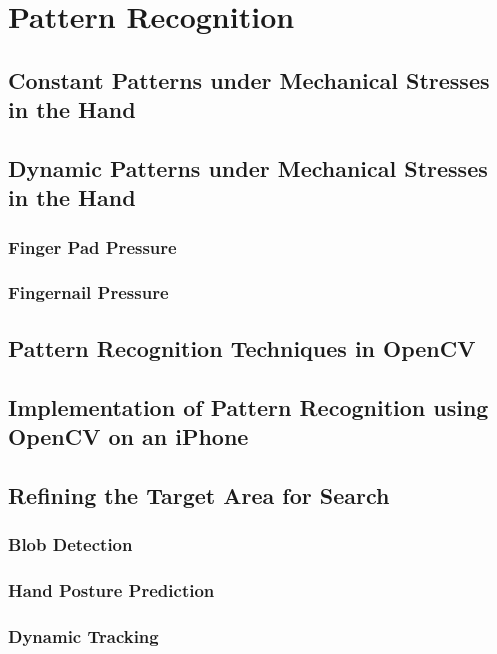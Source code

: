 \documentclass[10pt,a4paper]{article}
\begin{document}
\section{Pattern Recognition}\label{sec:PatternRecognition}


\subsection{Constant Patterns under Mechanical Stresses in the Hand}\label{sec:ConstantPatterns}
\subsection{Dynamic Patterns under Mechanical Stresses in the Hand}\label{sec:DynamicPatterns}
\subsubsection{Finger Pad Pressure}\label{sec:FingerPadPressure}
\subsubsection{Fingernail Pressure}\label{sec:FingernailPressure}
\subsection{Pattern Recognition Techniques in OpenCV}\label{sec:PaternRecognitionOpenCV}
\subsection{Implementation of Pattern Recognition using OpenCV on an iPhone}\label{sec:ImplementationOnIPhone}

\subsection{Refining the Target Area for Search}\label{sec:RefiningTargetAreaForSearch}
\subsubsection{Blob Detection}\label{sec:BlobDetection}
\subsubsection{Hand Posture Prediction}\label{sec:HandPosturePrediction}
\subsubsection{Dynamic Tracking}\label{sec:DynamicTracking}
\end{document}
